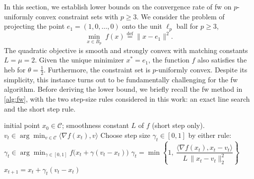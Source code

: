 \documentclass{article}
\newcommand{\C}{\mathcal{C}}
\newcommand{\norm}[1]{\|#1\|}
\newcommand{\ip}[1]{\langle #1 \rangle}
\newcommand{\defi}{\stackrel{\mathrm{\scriptscriptstyle def}}{=}}
\begin{document}
In this section, we establish lower bounds on the convergence rate of \gls{fw} on $p$-uniformly convex constraint sets with $p \geq 3$.
We consider the problem of projecting the point $e_1 = (1,0,\dots,0)$ onto the unit $\ell_p$ ball for $p\geq 3$,
\begin{equation}\label{eq:model}
    \min_{x\in B_p}\; f(x) \defi  \norm{x-e_1}^2.
\end{equation}
The quadratic objective is smooth and strongly convex with matching constants $L=\mu=2$.
Given the unique minimizer $x^* = e_1$, the function $f$ also satisfies the \gls{heb} for $\theta = \frac12$.
Furthermore, the constraint set is $p$-uniformly convex.
Despite its simplicity, this instance turns out to be fundamentally challenging for the \gls{fw} algorithm.
Before deriving the lower bound, we briefly recall the \gls{fw} method in \cref{alg:fw}, with the two step-size rules considered in this work: an exact line search and the short step rule.
\begin{algorithm}[H]
    \caption{\gls{fw} with exact line search or short step \label{alg:fw}}
    \begin{algorithmic}[1]
        \Require initial point $x_0\in\C $; smoothness constant $L$ of $f$ (short step only).
        \State $v_t \in \arg\min_{v\in \C }\ip{\nabla f(x_t),v}$
        \State Choose step size $\gamma_t\in[0,1]$ by either rule:
        \Statex \qquad\quad $\gamma_t\in\arg\min_{\gamma\in[0,1]} f\bigl(x_t+\gamma(v_t-x_t)\bigr)$ 
        \Statex \qquad\quad  $\gamma_t = \min\!\left\{1,\ \dfrac{\ip{\nabla f(x_t),x_t-v_t}}{L\,\norm{x_t-v_t}_2^2}\right\}$ 
        \State $x_{t+1}=x_t+\gamma_t(v_t-x_t)$
        \EndFor
    \end{algorithmic}
\end{algorithm}
\end{document}
